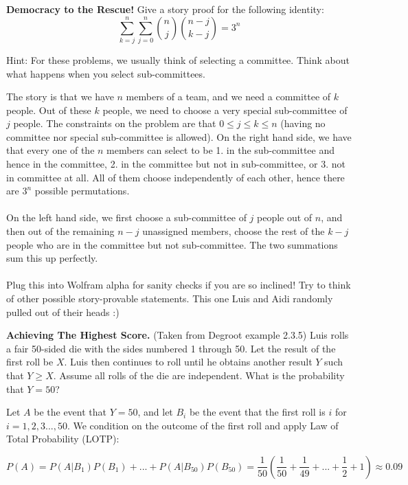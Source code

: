 \documentclass[11pt]{article}
\begin{document}
\begin{exercise}
\textbf{Democracy to the Rescue!} Give a story proof for the following identity:
$$
\sum_{k=j}^n \sum_{j=0}^n \binom{n}{j} \binom{n-j}{k-j} = 3^n
$$
\end{exercise}
Hint: For these problems, we usually think of selecting a committee. Think about what happens when you select sub-committees.
\begin{solution}
The story is that we have $n$ members of a team, and we need a committee of $k$ people. Out of these $k$ people, we need to choose a very special sub-committee of $j$ people. The constraints on the problem are that $0 \le j \le k \le n$ (having no committee nor special sub-committee is allowed). On the right hand side, we have that every one of the $n$ members can select to be 1. in the sub-committee and hence in the committee, 2. in the committee but not in sub-committee, or 3. not in committee at all. All of them choose independently of each other, hence there are $3^n$ possible permutations.\\
\\
On the left hand side, we first choose a sub-committee of $j$ people out of $n$, and then out of the remaining $n-j$ unassigned members, choose the rest of the $k-j$ people who are in the committee but not sub-committee. The two summations sum this up perfectly.\\
\\
Plug this into Wolfram alpha for sanity checks if you are so inclined! Try to think of other possible story-provable statements. This one Luis and Aidi randomly pulled out of their heads :)
\end{solution}

\begin{exercise}
\textbf{Achieving The Highest Score.} (Taken from Degroot example 2.3.5) Luis rolls a fair 50-sided die with the sides numbered 1 through 50. Let the result of the first roll be $X$. Luis then continues to roll until he obtains another result $Y$ such that $Y \ge X$. Assume all rolls of the die are independent. What is the probability that $Y = 50$?
\end{exercise}
\begin{solution}
Let $A$ be the event that $Y = 50$, and let $B_i$ be the event that the first roll is $i$ for $i = 1,2,3...,50$. We condition on the outcome of the first roll and apply Law of Total Probability (LOTP):

$$P(A) = P(A|B_1)P(B_1) + ... + P(A|B_{50})P(B_{50}) = \frac{1}{50} (\frac{1}{50} + \frac{1}{49} + ... + \frac{1}{2} + 1) \approx 0.09$$
\end{solution}
\end{document}
